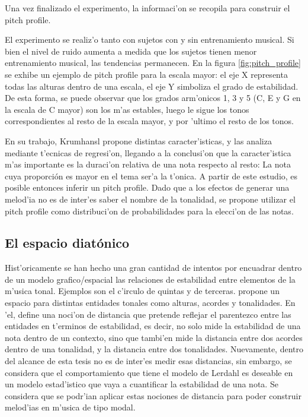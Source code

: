 Una vez finalizado el experimento, la informaci'on se recopila para construir el pitch profile.

El experimento se realiz'o tanto con sujetos con y sin entrenamiento musical. Si bien el nivel de ruido aumenta a medida que los sujetos 
tienen menor entrenamiento musical, las tendencias permanecen. En la figura \ref{fig:pitch_profile} se exhibe un ejemplo de pitch profile para la escala mayor: 
el eje X representa todas las alturas dentro de una escala, el eje Y simboliza el grado de estabilidad. De esta forma, se puede observar que los grados arm'onicos
1, 3 y 5 (C, E y G en la escala de C mayor) son los m'as estables, luego le sigue los tonos correspondientes al resto de la escala mayor, y por 'ultimo el resto de los 
tonos.


\begin{imagen}
    \width{10cm}
\end{imagen}


En su trabajo, Krumhansl propone distintas caracter'isticas, y las analiza mediante t'ecnicas de regresi'on, llegando a la conclusi'on que la
caracter'istica m'as importante es la duraci'on relativa de una nota respecto al resto: La nota cuya proporci\'on es mayor en el tema ser'a la t'onica. A partir de este 
estudio, es posible entonces inferir un pitch profile. Dado que a los efectos de generar una melod'ia no es de inter'es saber el nombre de la tonalidad, se propone 
utilizar el pitch profile como distribuci'on de probabilidades para la elecci'on de las notas.

\subsection{El espacio diat\'onico}
Hist'oricamente se han hecho una gran cantidad de intentos por encuadrar dentro de un modelo grafico/espacial las relaciones de estabilidad entre elementos de la m'usica
tonal. Ejemplos son el c'irculo de quintas y de terceras. \cite{Lerdahl2001} propone un espacio para distintas entidades tonales como alturas, 
acordes y tonalidades. En 'el, define una noci'on de distancia que pretende reflejar el parentezco entre las entidades en t'erminos de estabilidad, es decir, no solo 
mide la estabilidad de una nota dentro de un contexto, sino que tambi'en mide la distancia entre dos acordes dentro de una tonalidad, y la distancia entre dos tonalidades. 
Nuevamente, dentro del alcance de esta tesis no es de inter'es medir esas distancias, sin embargo, se considera que el comportamiento que tiene el modelo de Lerdahl es deseable en un modelo estad'istico
que vaya a cuantificar la estabilidad de una nota. Se considera que se podr'ian aplicar estas nociones de distancia para poder construir melod'ias en m'usica de 
tipo modal.

